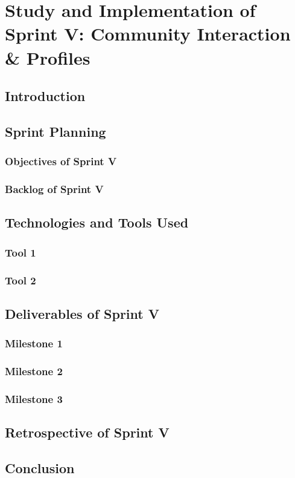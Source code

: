 \documentclass[a4paper,12pt]{report}
\begin{document}
\chapter{Study and Implementation of Sprint V: Community Interaction \& Profiles}

\section{Introduction}
\section{Sprint Planning}
\subsection{Objectives of Sprint V}
\subsection{Backlog of Sprint V}
\section{Technologies and Tools Used}
\subsection{Tool 1}
\subsection{Tool 2}
\section{Deliverables of Sprint V}
\subsection{Milestone 1}
\subsection{Milestone 2}
\subsection{Milestone 3}
\section{Retrospective of Sprint V}
\section{Conclusion}
\end{document}
